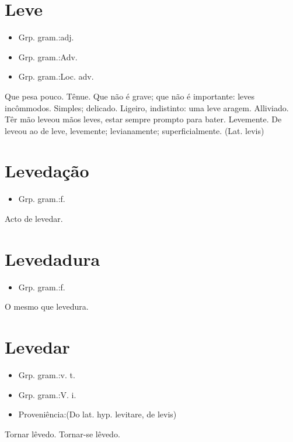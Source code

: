\section{Leve}
\begin{itemize}
\item {Grp. gram.:adj.}
\end{itemize}
\begin{itemize}
\item {Grp. gram.:Adv.}
\end{itemize}
\begin{itemize}
\item {Grp. gram.:Loc. adv.}
\end{itemize}
Que pesa pouco.
Tênue.
Que não é grave; que não é importante: \textunderscore leves incômmodos\textunderscore .
Simples; delicado.
Ligeiro, indistinto: \textunderscore uma leve aragem\textunderscore .
Alliviado.
\textunderscore Têr mão leve\textunderscore  ou \textunderscore mãos leves\textunderscore , estar sempre prompto para bater.
Levemente.
\textunderscore De leve\textunderscore  ou \textunderscore ao de leve\textunderscore , levemente; levianamente; superficialmente. (Lat. \textunderscore levis\textunderscore )
\section{Levedação}
\begin{itemize}
\item {Grp. gram.:f.}
\end{itemize}
Acto de levedar.
\section{Levedadura}
\begin{itemize}
\item {Grp. gram.:f.}
\end{itemize}
O mesmo que \textunderscore levedura\textunderscore .
\section{Levedar}
\begin{itemize}
\item {Grp. gram.:v. t.}
\end{itemize}
\begin{itemize}
\item {Grp. gram.:V. i.}
\end{itemize}
\begin{itemize}
\item {Proveniência:(Do lat. hyp. \textunderscore levitare\textunderscore , de \textunderscore levis\textunderscore )}
\end{itemize}
Tornar lêvedo.
Tornar-se lêvedo.
